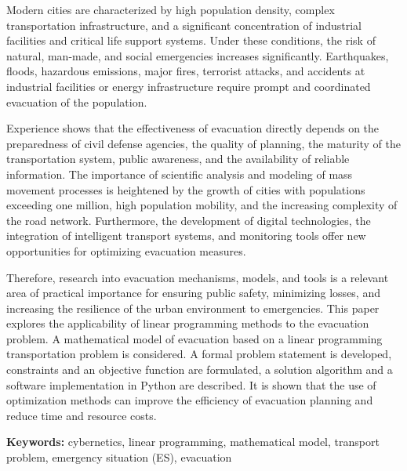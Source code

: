 Modern cities are characterized by high population density, complex
transportation infrastructure, and a significant concentration of
industrial facilities and critical life support systems. Under these
conditions, the risk of natural, man-made, and social emergencies
increases significantly. Earthquakes, floods, hazard\-ous emissions, major
fires, terrorist attacks, and accidents at industrial facilities or
energy infrastructure require prompt and coordinated evacuation of the
population.

Experience shows that the effectiveness of evacuation directly depends
on the preparedness of civil defense agencies, the quality of planning,
the maturity of the transportation system, public awareness, and the
availability of reliable information. The importance of scientific
analysis and modeling of mass movement processes is heightened by the
growth of cities with populations exceeding one million, high population
mobility, and the increasing complexity of the road network.
Furthermore, the development of digital technologies, the integration of
intelligent transport systems, and monitoring tools offer new
opportunities for optimizing evacuation measures.

Therefore, research into evacuation mechanisms, models, and tools is a
relevant area of practical import\-ance for
ensuring public safety, minimizing losses, and increasing the resilience
of the urban environment to emergencies. This paper explores the
applicability of linear programming methods to the evacuation problem. A
mathematical model of evacuation based on a linear programming
transportation problem is considered. A formal problem statement is
developed, constraints and an objective function are formulated, a
solution algorithm and a software implementation in Python are
described. It is shown that the use of optimization methods can improve
the efficiency of evacuation planning and reduce time and resource
costs.

{\bfseries Keywords:} cybernetics, linear programming, mathematical model,
transport problem, emergency situa\-tion (ES), evacuation

